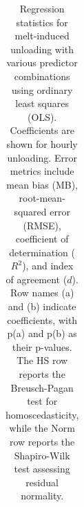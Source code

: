 \documentclass[
  letterpaper,
]{tex/uofsthesis-cs}
\begin{document}
\begin{landscape}

\begin{longtable}[]{@{}
  >{\raggedright\arraybackslash}p{}
  >{\raggedright\arraybackslash}p{}
  >{\raggedright\arraybackslash}p{}
  >{\raggedright\arraybackslash}p{}
  >{\raggedright\arraybackslash}p{}
  >{\raggedright\arraybackslash}p{}@{}}

\caption{\label{tbl-melt-reg-full}Regression statistics for melt-induced
unloading with various predictor combinations using ordinary least
squares (OLS). Coefficients are shown for hourly unloading. Error
metrics include mean bias (MB), root-mean-squared error (RMSE),
coefficient of determination (\(R^2\)), and index of agreement (\(d\)).
Row names (a) and (b) indicate coefficients, with p(a) and p(b) as their
p-values. The HS row reports the Breusch-Pagan test for
homoscedasticity, while the Norm row reports the Shapiro-Wilk test
assessing residual normality.}

\tabularnewline


\end{longtable}
\end{landscape}
\end{document}
